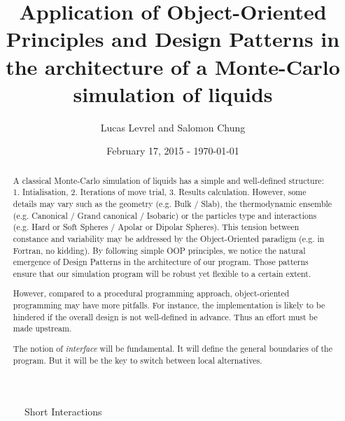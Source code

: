 \documentclass[a4paper, 10pt]{article}
\title{Application of Object-Oriented Principles and Design Patterns in the architecture of
    a Monte-Carlo simulation of liquids}
\author{Lucas Levrel and Salomon Chung}
\date{February 17, 2015 - \today{}}
\begin{document}
    \maketitle

    \begin{abstract}
        A classical Monte-Carlo simulation of liquids has a simple and well-defined structure:
        1. Intialisation, 2. Iterations of move trial, 3. Results calculation.
        However, some details may vary such as the geometry (e.g. Bulk / Slab),
        the thermodynamic ensemble (e.g. Canonical / Grand canonical / Isobaric)
        or the particles type and interactions (e.g. Hard or Soft Spheres /
        Apolar or Dipolar Spheres).
        This tension between constance and variability may be addressed by
        the Object-Oriented paradigm (e.g. in Fortran, no kidding).
        By following simple OOP principles, we notice the natural emergence of Design Patterns
        in the architecture of our program.
        Those patterns ensure that our simulation program will be robust yet flexible
        to a certain extent.

        However, compared to a procedural programming approach, object-oriented programming
        may have more pitfalls.
        For instance, the implementation is likely to be hindered if the overall design is
        not well-defined in advance. Thus an effort must be made upstream.

        The notion of \emph{interface} will be fundamental. It will define the general boundaries of
        the program. But it will be the key to switch between local alternatives.
    \end{abstract}

    \begin{landscape}
        \renewcommand{\familydefault}{\sfdefault}
        \begin{figure}[htb]
            \centering
            
            \caption{Short Interactions}
        \end{figure}
        \renewcommand{\familydefault}{\rmdefault}
    \end{landscape}

    \nocite{*}
    \printbibliography
\end{document}
